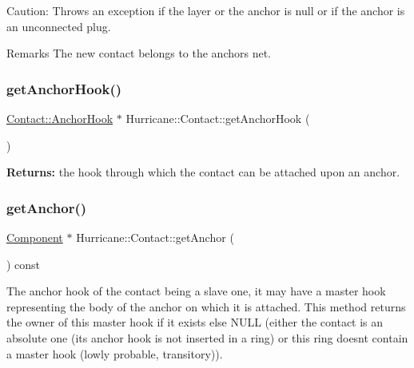 \begin{DoxyParagraph}{Caution\+: Throws an exception if the layer or the anchor is null or if }
the anchor is an unconnected plug.
\end{DoxyParagraph}
\begin{DoxyRemark}{Remarks}
The new contact belongs to the anchor\textquotesingle{}s net. 
\end{DoxyRemark}
\mbox{\label{classHurricane_1_1Contact_a300306b006397377bc9a54ea783c1150}} 
\subsubsection{\texorpdfstring{get\+Anchor\+Hook()}{getAnchorHook()}}
{\footnotesize\ttfamily \mbox{\hyperlink{classHurricane_1_1Contact_1_1AnchorHook}{Contact\+::\+Anchor\+Hook}} $\ast$ Hurricane\+::\+Contact\+::get\+Anchor\+Hook (\begin{DoxyParamCaption}{ }\end{DoxyParamCaption})\hspace{0.3cm}{\ttfamily [inline]}}

{\bfseries Returns\+:} the hook through which the contact can be attached upon an anchor. \mbox{\label{classHurricane_1_1Contact_ab0b327b306bf7ebda634f59d8d0cfd8f}} 
\subsubsection{\texorpdfstring{get\+Anchor()}{getAnchor()}}
{\footnotesize\ttfamily \mbox{\hyperlink{classHurricane_1_1Component}{Component}} $\ast$ Hurricane\+::\+Contact\+::get\+Anchor (\begin{DoxyParamCaption}{ }\end{DoxyParamCaption}) const}

The anchor hook of the contact being a slave one, it may have a master hook representing the body of the anchor on which it is attached. This method returns the owner of this master hook if it exists else N\+U\+LL (either the contact is an absolute one (its anchor hook is not inserted in a ring) or this ring doesn\textquotesingle{}t contain a master hook (lowly probable, transitory)). \mbox{\label{classHurricane_1_1Contact_a8a5c4475668b6c6730ed5265e5447553}} 
